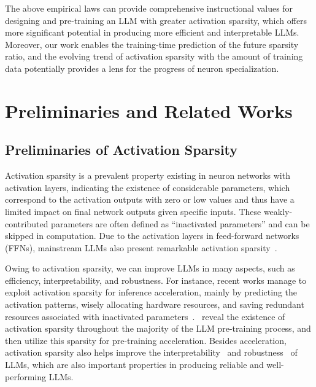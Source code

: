 \documentclass{article} %
\begin{document}
The above empirical laws can provide comprehensive instructional values for designing and pre-training an LLM with greater activation sparsity, which offers more significant potential in producing more efficient and interpretable LLMs. Moreover, our work enables the training-time prediction of the future sparsity ratio, and the evolving trend of activation sparsity with the amount of training data potentially provides a lens for the progress of neuron specialization.

\section{Preliminaries and Related Works}

\subsection{Preliminaries of Activation Sparsity}

Activation sparsity is a prevalent property existing in neuron networks with activation layers, indicating the existence of considerable parameters, which correspond to the activation outputs with zero or low values and thus have a limited impact on final network outputs given specific inputs. These weakly-contributed parameters are often defined as ``inactivated parameters'' and can be skipped in computation. Due to the activation layers in feed-forward networks (FFNs), mainstream LLMs also present remarkable activation sparsity~\citep{li2022lazy,zhang2022moefication,song2024prosparse}.

Owing to activation sparsity, we can improve LLMs in many aspects, such as efficiency, interpretability, and robustness. For instance, recent works manage to exploit activation sparsity for inference acceleration, mainly by predicting the activation patterns, wisely allocating hardware resources, and saving redundant resources associated with inactivated parameters~\citep{liu2023deja,song2023powerinfer,xue2024powerinfer}.~\citet{zhang2024exploring} reveal the existence of activation sparsity throughout the majority of the LLM pre-training process, and then utilize this sparsity for pre-training acceleration.
Besides acceleration, activation sparsity also helps improve the interpretability~\citep{agarap2018deep,dai2022knowledge,cuadros2022self,sajjad2022neuron} and robustness~\citep{ahmad2019can,muthukumar2023adversarial} of LLMs, which are also important properties in producing reliable and well-performing LLMs.
\end{document}
